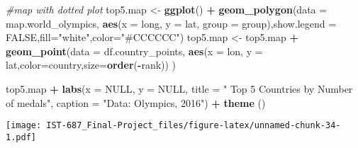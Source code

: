 \documentclass[]{article}
\newenvironment{Shaded}{\begin{snugshade}}{\end{snugshade}}
\newcommand{\CommentTok}[1]{\textcolor[rgb]{0.56,0.35,0.01}{\textit{#1}}}
\newcommand{\DataTypeTok}[1]{\textcolor[rgb]{0.13,0.29,0.53}{#1}}
\newcommand{\KeywordTok}[1]{\textcolor[rgb]{0.13,0.29,0.53}{\textbf{#1}}}
\newcommand{\NormalTok}[1]{#1}
\newcommand{\OperatorTok}[1]{\textcolor[rgb]{0.81,0.36,0.00}{\textbf{#1}}}
\newcommand{\OtherTok}[1]{\textcolor[rgb]{0.56,0.35,0.01}{#1}}
\newcommand{\StringTok}[1]{\textcolor[rgb]{0.31,0.60,0.02}{#1}}
\begin{document}
\begin{Shaded}
\begin{Highlighting}[]
\CommentTok{#map with dotted plot}
\NormalTok{top5.map <-}\StringTok{ }\KeywordTok{ggplot}\NormalTok{() }\OperatorTok{+}\StringTok{ }\KeywordTok{geom_polygon}\NormalTok{(}\DataTypeTok{data =}\NormalTok{ map.world_olympics, }\KeywordTok{aes}\NormalTok{(}\DataTypeTok{x =}\NormalTok{ long, }\DataTypeTok{y =}\NormalTok{ lat, }\DataTypeTok{group =}\NormalTok{ group),}\DataTypeTok{show.legend =} \OtherTok{FALSE}\NormalTok{,}\DataTypeTok{fill=}\StringTok{"white"}\NormalTok{,}\DataTypeTok{color=}\StringTok{"#CCCCCC"}\NormalTok{) }
\NormalTok{top5.map <-}\StringTok{ }\NormalTok{top5.map }\OperatorTok{+}\StringTok{  }\KeywordTok{geom_point}\NormalTok{(}\DataTypeTok{data =}\NormalTok{ df.country_points, }\KeywordTok{aes}\NormalTok{(}\DataTypeTok{x =}\NormalTok{ lon, }\DataTypeTok{y =}\NormalTok{ lat,}\DataTypeTok{color=}\NormalTok{country,}\DataTypeTok{size=}\KeywordTok{order}\NormalTok{(}\OperatorTok{-}\NormalTok{rank)) )}
        
\NormalTok{top5.map }\OperatorTok{+}\StringTok{  }\KeywordTok{labs}\NormalTok{(}\DataTypeTok{x =} \OtherTok{NULL}\NormalTok{, }
                  \DataTypeTok{y =} \OtherTok{NULL}\NormalTok{, }
                  \DataTypeTok{title =} \StringTok{" Top 5 Countries by Number of medals"}\NormalTok{, }
                  \DataTypeTok{caption =} \StringTok{"Data: Olympics, 2016"}\NormalTok{) }\OperatorTok{+}\StringTok{ }\KeywordTok{theme}\NormalTok{ () }
\end{Highlighting}
\end{Shaded}

\texttt{[image: IST-687\_Final-Project\_files/figure-latex/unnamed-chunk-34-1.pdf]}
\end{document}
